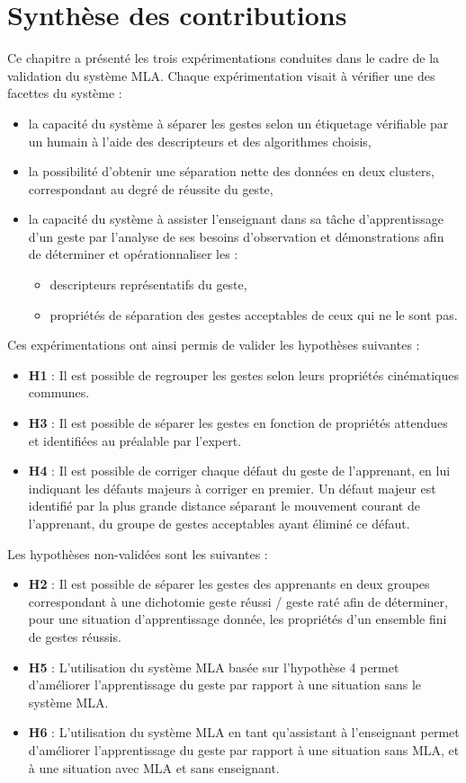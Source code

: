 \section{Synthèse des contributions}
Ce chapitre a présenté les trois expérimentations conduites dans le cadre de la validation du système MLA. Chaque expérimentation visait à vérifier une des facettes du système :
\begin{itemize}
	\item la capacité du système à séparer les gestes selon un étiquetage vérifiable par un humain à l'aide des descripteurs et des algorithmes choisis,
	\item la possibilité d'obtenir une séparation nette des données en deux clusters, correspondant au degré de réussite du geste,
	\item la capacité du système à assister l'enseignant dans sa tâche d'apprentissage d'un geste par l'analyse de ses besoins d'observation et démonstrations afin de déterminer et opérationnaliser les :
	\begin{itemize}
		\item descripteurs représentatifs du geste,
		\item propriétés de séparation des gestes acceptables de ceux qui ne le sont pas.
	\end{itemize}
\end{itemize}

Ces expérimentations ont ainsi permis de valider les hypothèses suivantes :
\begin{itemize}
    \item \textbf{H1} : Il est possible de regrouper les gestes selon leurs propriétés cinématiques communes.
	\item \textbf{H3} : Il est possible de séparer les gestes en fonction de propriétés attendues et identifiées au préalable par l'expert.
	\item \textbf{H4} : Il est possible de corriger chaque défaut du geste de l'apprenant, en lui indiquant les défauts majeurs à corriger en premier. Un défaut majeur est identifié par la plus grande distance séparant le mouvement courant de l'apprenant, du groupe de gestes acceptables ayant éliminé ce défaut.
\end{itemize}

Les hypothèses non-validées sont les suivantes :
\begin{itemize}
	\item \textbf{H2} : Il est possible de séparer les gestes des apprenants en deux groupes correspondant à une dichotomie geste réussi / geste raté afin de déterminer, pour une situation d'apprentissage donnée, les propriétés d'un ensemble fini de gestes réussis.
	\item \textbf{H5} : L'utilisation du système MLA basée sur l'hypothèse 4 permet d'améliorer l'apprentissage du geste par rapport à une situation sans le système MLA.
	\item \textbf{H6} : L'utilisation du système MLA en tant qu'assistant à l'enseignant permet d'améliorer l'apprentissage du geste par rapport à une situation sans MLA, et à une situation avec MLA et sans enseignant.
\end{itemize}

